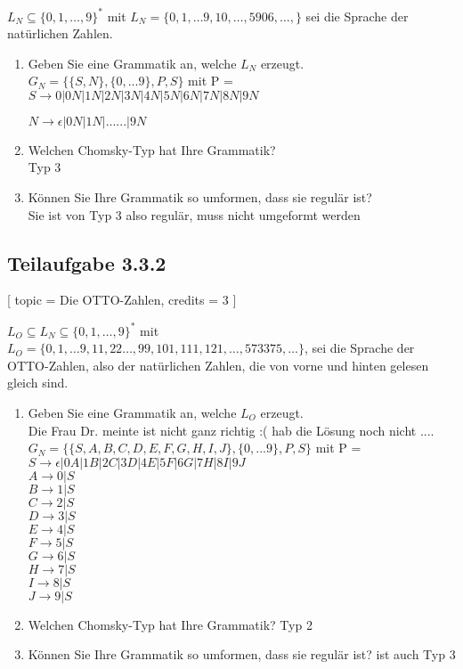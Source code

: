 \documentclass[12pt]{article}
\begin{document}
 $L_N \subseteq \{0,1,\ldots,9\}^*$ mit $L_N = \{0, 1, \ldots 9, 10, \ldots, 5906, \ldots, \}$ sei die Sprache der natürlichen Zahlen. 
 \begin{enumerate} 
 \item Geben Sie eine Grammatik an, welche $L_N$ erzeugt.  
 \\
 $G_N = \{\{S,N\},\{0,...9\},P,S\}$ mit P =\\
 
 $S \rightarrow 0|0N|1N|2N|3N|4N|5N|6N|7N|8N|9N$
 
 $N \rightarrow \epsilon|0N|1N|......|9N$
 \item Welchen Chomsky-Typ hat Ihre Grammatik? \\
 Typ 3
 \item Können Sie Ihre Grammatik so umformen, dass sie regulär ist? \\
 Sie ist von Typ 3 also regulär, muss nicht umgeformt werden
 \end{enumerate}  
  
  
  
  
 \subsection*{Teilaufgabe 3.3.2} [ 
 topic = Die OTTO-Zahlen, 
 credits = 3 
 ] 
  
 $L_O \subseteq L_N \subseteq \{0,1,\ldots,9\}^*$ mit $L_O = \{0, 1, \ldots 9, 11, 22 \ldots , 99, 101, 111, 121, \ldots , 573375, \ldots \}$, sei die Sprache der OTTO-Zahlen, also der natürlichen Zahlen, die von vorne und hinten gelesen gleich sind. 
 \begin{enumerate} 
 \item Geben Sie eine Grammatik an, welche $L_O$ erzeugt.\\ 
 Die Frau Dr. meinte ist nicht ganz richtig :( hab die Lösung noch nicht ....\\
 $G_N = \{\{S,A,B,C,D,E,F,G,H,I,J\},\{0,...9\},P,S\}$ mit P =\\
 $S \rightarrow \epsilon|0A|1B|2C|3D|4E|5F|6G|7H|8I|9J$\\
 $A \rightarrow 0 | S$\\
 $B \rightarrow 1 | S$\\
 $C \rightarrow 2 | S$\\
 $D \rightarrow 3 | S$\\
 $E \rightarrow 4 | S$\\
 $F \rightarrow 5 | S$\\
 $G \rightarrow 6 | S$\\
 $H \rightarrow 7 | S$\\
 $I \rightarrow 8 | S$\\
 $J \rightarrow 9 | S$ 
 \item Welchen Chomsky-Typ hat Ihre Grammatik? 
 Typ 2
 \item Können Sie Ihre Grammatik so umformen, dass sie regulär ist? 
 ist auch Typ 3
 \end{enumerate}  
  
  
 
\end{document}

